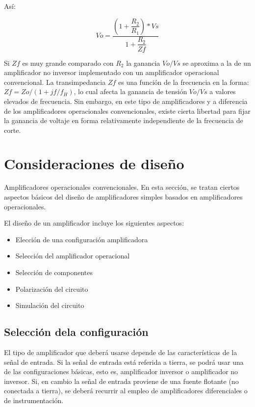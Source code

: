 Así:

\begin{equation}
	Vo = \frac{\left(1 + \dfrac{R_2}{R_1}\right) * Vs}{1 + \dfrac{R_2}{Zf}}
\end{equation}

Si $Zf$ es muy grande comparado con $R_2$ la ganancia $Vo/Vs$ se aproxima a la de un amplificador no inversor implementado con un amplificador operacional convencional. La transimpedancia $Zf$ es una función de la frecuencia en la forma: $Zf = Zo / (1 + jf/f_H)$, lo cual afecta la ganancia de tensión $Vo/Vs$ a valores elevados de frecuencia. Sin embargo, en este tipo de amplificadores y a diferencia de los amplificadores operacionales convencionales, existe cierta libertad para fijar la ganancia de voltaje en forma relativamente independiente de la frecuencia de corte.

\section{Consideraciones de diseño}
Amplificadores operacionales convencionales. En esta sección, se tratan ciertos aspectos básicos del diseño de amplificadores simples basados en amplificadores operacionales.

El diseño de un amplificador incluye los siguientes aspectos:

\begin{itemize}
	\item Elección de una configuración amplificadora
	\item Selección del amplificador operacional
	\item Selección de componentes
	\item Polarización del circuito
	\item Simulación del circuito
\end{itemize}

\subsection{Selección dela configuración}
El tipo de amplificador que deberá usarse depende de las características de la señal de entrada. Si la señal de entrada está referida a tierra, se podrá usar una de las configuraciones básicas, esto es, amplificador inversor o amplificador no inversor. Si, en cambio la señal de entrada proviene de una fuente flotante (no conectada a tierra), se deberá recurrir al empleo de amplificadores diferenciales o de instrumentación.

